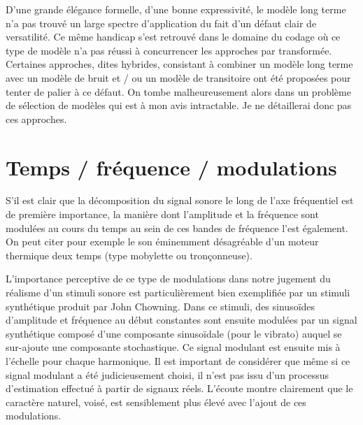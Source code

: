 D'une grande élégance formelle, d'une bonne expressivité, le modèle long terme n'a pas trouvé un large spectre d'application du fait d'un défaut clair de versatilité. Ce même handicap s'est retrouvé dans le domaine du codage où ce type de modèle n'a pas réussi à concurrencer les approches par transformée.~\cite{den2002parametric} Certaines approches, dites hybrides, consistant à combiner un modèle long terme avec un modèle de bruit et / ou un modèle de transitoire ont été proposées pour tenter de palier à ce défaut. On tombe malheureusement alors dans un problème de sélection de modèles qui est à mon avis intractable. Je ne détaillerai donc pas ces approches.


\section{ \nmu Temps / fréquence / modulations}  \label{sec:tfm}

S'il est clair que la décomposition du signal sonore le long de l'axe fréquentiel est de première importance, la manière dont l'amplitude et la fréquence sont modulées au cours du temps au sein de ces bandes de fréquence l'est également. On peut citer pour exemple le son éminemment désagréable d'un moteur thermique deux temps (type mobylette ou tronçonneuse).


L'importance perceptive de ce type de modulations dans notre jugement du réalisme d'un stimuli sonore est particulièrement bien exemplifiée par un stimuli synthétique produit par John Chowning. Dans ce stimuli, des sinusoïdes d'amplitude et fréquence au début constantes sont ensuite modulées par un signal synthétique composé d'une composante sinusoïdale (pour le vibrato) auquel se sur-ajoute une composante stochastique. Ce signal modulant est ensuite mis à l'échelle pour chaque harmonique. Il est important de considérer que même si ce signal modulant a été judicieusement choisi, il n'est pas issu d'un processus d'estimation effectué à partir de signaux réels. L'écoute montre clairement que le caractère naturel, voisé, est sensiblement plus élevé avec l'ajout de ces modulations.

